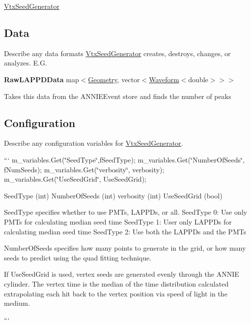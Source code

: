 \hyperlink{classVtxSeedGenerator}{Vtx\-Seed\-Generator}

\subsection*{Data}

Describe any data formats \hyperlink{classVtxSeedGenerator}{Vtx\-Seed\-Generator} creates, destroys, changes, or analyzes. E.\-G.

{\bfseries Raw\-L\-A\-P\-P\-D\-Data} {\ttfamily map$<$\hyperlink{classGeometry}{Geometry}, vector$<$\hyperlink{classWaveform}{Waveform}$<$double$>$$>$$>$}
\begin{DoxyItemize}
\item Takes this data from the {\ttfamily A\-N\-N\-I\-E\-Event} store and finds the number of peaks
\end{DoxyItemize}

\subsection*{Configuration}

Describe any configuration variables for \hyperlink{classVtxSeedGenerator}{Vtx\-Seed\-Generator}.

``` m\-\_\-variables.\-Get(\char`\"{}\-Seed\-Type\char`\"{},f\-Seed\-Type); m\-\_\-variables.\-Get(\char`\"{}\-Number\-Of\-Seeds\char`\"{}, f\-Num\-Seeds); m\-\_\-variables.\-Get(\char`\"{}verbosity\char`\"{}, verbosity); m\-\_\-variables.\-Get(\char`\"{}\-Use\-Seed\-Grid\char`\"{}, Use\-Seed\-Grid);

Seed\-Type (int) Number\-Of\-Seeds (int) verbosity (int) Use\-Seed\-Grid (bool)

Seed\-Type specifies whether to use P\-M\-Ts, L\-A\-P\-P\-Ds, or all. Seed\-Type 0\-: Use only P\-M\-Ts for calculating median seed time Seed\-Type 1\-: User only L\-A\-P\-P\-Ds for calculating median seed time Seed\-Type 2\-: Use both the L\-A\-P\-P\-Ds and the P\-M\-Ts

Number\-Of\-Seeds specifies how many points to generate in the grid, or how many seeds to predict using the quad fitting technique.

If Use\-Seed\-Grid is used, vertex seeds are generated evenly through the A\-N\-N\-I\-E cylinder. The vertex time is the median of the time distribution calculated extrapolating each hit back to the vertex position via speed of light in the medium.

``` 